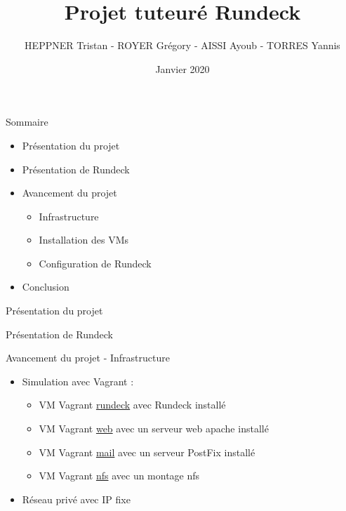 \documentclass{beamer}
\title{Projet tuteuré Rundeck}
\author{HEPPNER Tristan - ROYER Grégory -
AISSI Ayoub - TORRES Yannis }
\date{Janvier 2020}
\begin{document}
\maketitle

\begin{frame}{Sommaire}
    \begin{itemize}
        \item Présentation du projet
        \pause
        \item Présentation de Rundeck
        \pause
        \item Avancement du projet
            \begin{itemize}
                \item Infrastructure
                \item Installation des VMs
                \item Configuration de Rundeck
            \end{itemize}{}
        \pause
        \item Conclusion
    \end{itemize}{}
    
\end{frame}

\begin{frame}{Présentation du projet}
    
\end{frame}

\begin{frame}{Présentation de Rundeck}
    
\end{frame}

\begin{frame}{Avancement du projet - Infrastructure}

\begin{itemize}
    \item Simulation avec Vagrant :
        \begin{itemize}
            \item VM Vagrant \underline{rundeck} avec Rundeck installé
            \item VM Vagrant \underline{web} avec un serveur web apache installé
            \item VM Vagrant \underline{mail} avec un serveur PostFix installé
            \item VM Vagrant \underline{nfs} avec un montage nfs
        \end{itemize}
    \item Réseau privé avec IP fixe
    \end{itemize}    
\end{frame}
\end{document}
